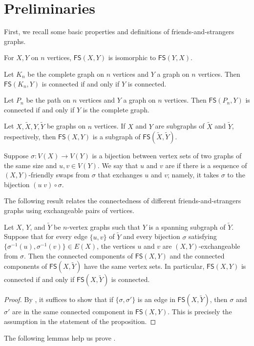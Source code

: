 \documentclass{mystyle}
\newcommand{\FS}{\mathsf{FS}}
\begin{document}
\section{Preliminaries}\label{sec_prelim}
First, we recall some basic properties and definitions of friends-and-strangers graphs. 
\begin{lemma}
    For $X, Y$ on $n$ vertices, $\FS(X, Y)$ is isomorphic to $\FS(Y,X)$. 
\end{lemma}
\begin{lemma}\label{lem_complete}
    Let $K_n$ be the complete graph on $n$ vertices and $Y$ a graph on $n$ vertices. Then $\FS(K_n, Y)$ is connected if and only if $Y$ is connected. 
\end{lemma}
\begin{lemma}\label{lem_path}
    Let $P_n$ be the path on $n$ vertices and $Y$ a graph on $n$ vertices. Then $\FS(P_n, Y)$ is connected if and only if $Y$ is the complete graph. 
\end{lemma}
\begin{lemma}\label{lem_spanning_subgraph}
    Let $X, \widetilde{X}, Y, \widetilde{Y}$ be graphs on $n$ vertices. If $X$ and $Y$ are subgraphs of $\widetilde{X}$ and $\widetilde{Y}$, respectively, then $\FS(X, Y)$ is a subgraph of $\FS(\widetilde{X}, \widetilde{Y})$. 
\end{lemma}
\begin{definition}\label{def_exchangeable}
    Suppose $\sigma: V(X) \to V(Y)$ is a bijection between vertex sets of two graphs of the same size and $u, v \in V(Y)$. We say that $u$ and $v$ are  if there is a sequence of $(X, Y)$-friendly swaps from $\sigma$ that exchanges $u$ and $v$; namely, it takes $\sigma$ to the bijection $(u \; v) \circ \sigma$.
\end{definition}
The following result relates the connectedness of different friends-and-strangers graphs using exchangeable pairs of vertices. 
\begin{proposition}\label{prop_exchange}
    Let $X$, $Y$, and $\widetilde{Y}$ be $n$-vertex graphs such that $Y$ is a spanning subgraph of $\widetilde{Y}$. Suppose that for every edge $\{u, v\}$ of $\widetilde{Y}$ and every bijection $\sigma$ satisfying $\{\sigma^{-1}(u), \sigma^{-1}(v)\} \in E(X)$, the vertices $u$ and $v$ are $(X, Y)$-exchangeable from $\sigma$. Then the connected components of $\FS(X,Y)$ and the connected components of $\FS(X, \widetilde{Y})$ have the same vertex sets. In particular, $\FS(X,Y)$ is connected if and only if $\FS(X, \widetilde{Y})$ is connected. 
\end{proposition}
\begin{proof}
    By , it suffices to show that if $\{\sigma,\sigma'\}$ is an edge in $\FS(X, \widetilde{Y})$, then $\sigma$ and $\sigma'$ are in the same connected component in $\FS(X,Y)$. This is precisely the assumption in the statement of the proposition. 
\end{proof}
The following lemmas help us prove . 
\end{document}
